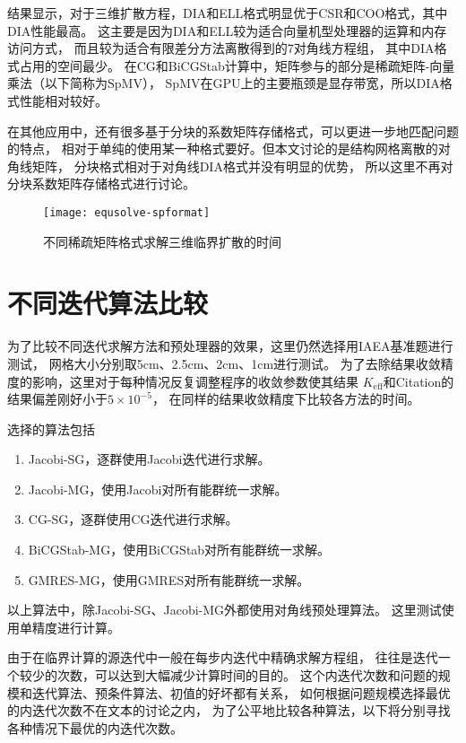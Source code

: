 结果显示，对于三维扩散方程，DIA和ELL格式明显优于CSR和COO格式，其中DIA性能最高。
这主要是因为DIA和ELL较为适合向量机型处理器的运算和内存访问方式，
而且较为适合有限差分方法离散得到的7对角线方程组，
其中DIA格式占用的空间最少。
在CG和BiCGStab计算中，矩阵参与的部分是稀疏矩阵-向量乘法（以下简称为SpMV），
SpMV在GPU上的主要瓶颈是显存带宽\cite{bell2008spmv,
baskaran2008optimizing}，所以DIA格式性能相对较好。

在其他应用中，还有很多基于分块的系数矩阵存储格式，可以更进一步地匹配问题的特点，
相对于单纯的使用某一种格式要好。但本文讨论的是结构网格离散的对角线矩阵，
分块格式相对于对角线DIA格式并没有明显的优势，
所以这里不再对分块系数矩阵存储格式进行讨论。



\begin{figure}
\centering
\texttt{[image: equsolve-spformat]}
\caption{\label{fig:equsolve.spformat}不同稀疏矩阵格式求解三维临界扩散的时间}
\end{figure}


\section{不同迭代算法比较}

为了比较不同迭代求解方法和预处理器的效果，这里仍然选择用IAEA基准题进行测试，
网格大小分别取5cm、2.5cm、2cm、1cm进行测试。
为了去除结果收敛精度的影响，这里对于每种情况反复调整程序的收敛参数使其结果
$K_\mathrm{eff}$和Citation的结果偏差刚好小于$5\times10^{-5}$，
在同样的结果收敛精度下比较各方法的时间。

选择的算法包括
\begin{enumerate}
\item Jacobi-SG，逐群使用Jacobi迭代进行求解。
\item Jacobi-MG，使用Jacobi对所有能群统一求解。
\item CG-SG，逐群使用CG迭代进行求解。
\item BiCGStab-MG，使用BiCGStab对所有能群统一求解。
\item GMRES-MG，使用GMRES对所有能群统一求解。
\end{enumerate}
以上算法中，除Jacobi-SG、Jacobi-MG外都使用对角线预处理算法。
这里测试使用单精度进行计算。

由于在临界计算的源迭代中一般在每步内迭代中精确求解方程组，
往往是迭代一个较少的次数，可以达到大幅减少计算时间的目的。
这个内迭代次数和问题的规模和迭代算法、预条件算法、初值的好坏都有关系，
如何根据问题规模选择最优的内迭代次数不在文本的讨论之内，
为了公平地比较各种算法，以下将分别寻找各种情况下最优的内迭代次数。

